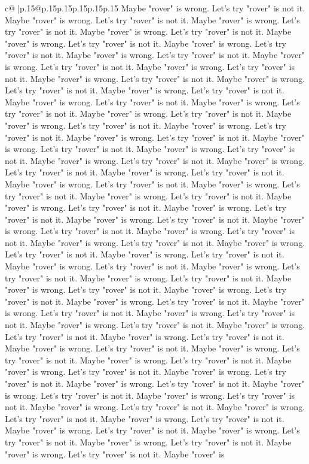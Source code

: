 \documentclass{article}
\begin{document}
{\begin{supertabular}{c@{$\;$}|p{.15\linewidth}@{}p{.15\linewidth}p{.15\linewidth}p{.15\linewidth}p{.15\linewidth}p{.15\linewidth}}
{{{Maybe "rover" is wrong. Let's try "rover" is not it. Maybe "rover" is wrong. Let's try "rover" is not it. Maybe "rover" is wrong. Let's try "rover" is not it. Maybe "rover" is wrong. Let's try "rover" is not it. Maybe "rover" is wrong. Let's try "rover" is not it. Maybe "rover" is wrong. Let's try "rover" is not it. Maybe "rover" is wrong. Let's try "rover" is not it. Maybe "rover" is wrong. Let's try "rover" is not it. Maybe "rover" is wrong. Let's try "rover" is not it. Maybe "rover" is wrong. Let's try "rover" is not it. Maybe "rover" is wrong. Let's try "rover" is not it. Maybe "rover" is wrong. Let's try "rover" is not it. Maybe "rover" is wrong. Let's try "rover" is not it. Maybe "rover" is wrong. Let's try "rover" is not it. Maybe "rover" is wrong. Let's try "rover" is not it. Maybe "rover" is wrong. Let's try "rover" is not it. Maybe "rover" is wrong. Let's try "rover" is not it. Maybe "rover" is wrong. Let's try "rover" is not it. Maybe "rover" is wrong. Let's try "rover" is not it. Maybe "rover" is wrong. Let's try "rover" is not it. Maybe "rover" is wrong. Let's try "rover" is not it. Maybe "rover" is wrong. Let's try "rover" is not it. Maybe "rover" is wrong. Let's try "rover" is not it. Maybe "rover" is wrong. Let's try "rover" is not it. Maybe "rover" is wrong. Let's try "rover" is not it. Maybe "rover" is wrong. Let's try "rover" is not it. Maybe "rover" is wrong. Let's try "rover" is not it. Maybe "rover" is wrong. Let's try "rover" is not it. Maybe "rover" is wrong. Let's try "rover" is not it. Maybe "rover" is wrong. Let's try "rover" is not it. Maybe "rover" is wrong. Let's try "rover" is not it. Maybe "rover" is wrong. Let's try "rover" is not it. Maybe "rover" is wrong. Let's try "rover" is not it. Maybe "rover" is wrong. Let's try "rover" is not it. Maybe "rover" is wrong. Let's try "rover" is not it. Maybe "rover" is wrong. Let's try "rover" is not it. Maybe "rover" is wrong. Let's try "rover" is not it. Maybe "rover" is wrong. Let's try "rover" is not it. Maybe "rover" is wrong. Let's try "rover" is not it. Maybe "rover" is wrong. Let's try "rover" is not it. Maybe "rover" is wrong. Let's try "rover" is not it. Maybe "rover" is wrong. Let's try "rover" is not it. Maybe "rover" is wrong. Let's try "rover" is not it. Maybe "rover" is wrong. Let's try "rover" is not it. Maybe "rover" is wrong. Let's try "rover" is not it. Maybe "rover" is wrong. Let's try "rover" is not it. Maybe "rover" is wrong. Let's try "rover" is not it. Maybe "rover" is wrong. Let's try "rover" is not it. Maybe "rover" is wrong. Let's try "rover" is not it. Maybe "rover" is wrong. Let's try "rover" is not it. Maybe "rover" is wrong. Let's try "rover" is not it. Maybe "rover" is wrong. Let's try "rover" is not it. Maybe "rover" is wrong. Let's try "rover" is not it. Maybe "rover" is wrong. Let's try "rover" is not it. Maybe "rover" is wrong. Let's try "rover" is not it. Maybe "rover" is wrong. Let's try "rover" is not it. Maybe "rover" is wrong. Let's try "rover" is not it. Maybe "rover" is wrong. Let's try "rover" is not it. Maybe "rover" is wrong. Let's try "rover" is not it. Maybe "rover" is wrong. Let's try "rover" is not it. Maybe "rover" is }}}
\end{supertabular}}
\end{document}
